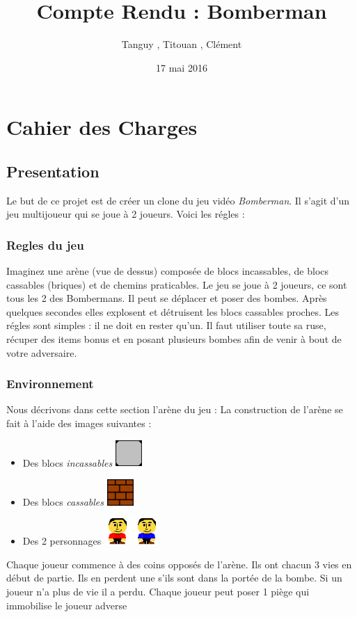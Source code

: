 \documentclass[a4paper,11pt,french]{article}
\title{Compte Rendu : Bomberman}
\author{Tanguy \bsc{Thomas}, Titouan \bsc{Rannou}, Clément \bsc{Guin}}
\date{17 mai 2016}
\begin{document}
\maketitle

\section{Cahier des Charges}
\subsection{Presentation}
Le but de ce projet est de créer un clone du jeu vidéo \textit{Bomberman}. Il s'agit d'un jeu multijoueur qui se joue à 2 joueurs. Voici les régles :
\subsubsection{Regles du jeu}
Imaginez une arène (vue de dessus) composée de blocs incassables, de blocs cassables (briques) et de chemins praticables. Le jeu se joue à 2 joueurs, ce sont tous les 2 des Bombermans. Il peut se déplacer et poser des bombes. Après quelques secondes elles explosent et détruisent les blocs cassables proches. Les régles sont simples : il ne doit en rester qu'un. Il faut utiliser toute sa ruse, récuper des items bonus et en posant plusieurs bombes afin de venir à bout de votre adversaire.

\subsubsection{Environnement}
Nous décrivons dans cette section l'arène du jeu :
La construction de l'arène se fait à l'aide des images suivantes :
\begin{itemize}
\item Des blocs \textit{incassables} %
\includegraphics[width=1cm,angle=0]{../blocs}
\item Des blocs \textit{cassables} %
\includegraphics[width=1cm,angle=0]{../briques}
\item Des  2 personnages  %
\includegraphics[width=1cm,angle=0]{../joueur1}
\includegraphics[width=1cm,angle=0]{../joueur2}
\end{itemize}
Chaque joueur commence à des coins opposés de l'arène. Ils ont chacun 3 vies en début de partie. Ils en perdent une s'ils sont dans la portée de la bombe. Si un joueur n'a plus de vie il a perdu. Chaque joueur peut poser 1 piège qui immobilise le joueur adverse
\end{document}
